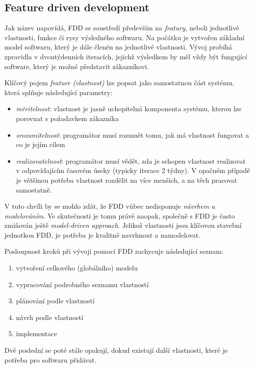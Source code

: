 \subsection{Feature driven development} \label{methods:fdd}

Jak název napovídá, FDD se soustředí především na \emph{featury}, neboli jednotlivé vlastnosti, funkce či rysy výsledného softwaru. Na počátku je vytvořen základní model softwaru, který je dále členěn na jednotlivé vlastnosti. Vývoj probíhá zpravidla v dvoutýdenních iteracích, jejichž výsledkem by měl vždy být fungující software, který je možné představit zákazníkovi.

Klíčový pojem \emph{feature (vlastnost)}  lze popsat jako samostatnou část systému, která splňuje následující parametry:
\begin{itemize}
	\item \emph{měritelnost}: vlastnost je jasně uchopitelná komponenta systému, kterou lze porovnat s požadavkem zákazníka
	\item \emph{srozumitelnost}: programátor musí rozumět tomu, jak má vlastnost fungovat a co je jejím cílem
	\item \emph{realizovatelnost}: programátor musí vědět, zda je schopen vlastnost realizovat v odpovídajícím časovém úseky (typicky iterace 2 týdny). V opačném případě je většinou potřeba vlastnost rozdělit na více menších, a na těch pracovat samostatně.
\end{itemize}

V tuto chvíli by se mohlo zdát, že FDD vůbec nedisponuje \emph{návrhem a modelováním}. Ve skutečnosti je tomu právě naopak, společně s FDD je často zmiňován ještě \emph{model-driven approach}. Jelikož vlastnosti jsou klíčovou stavební jednotkou FDD, je potřeba je kvalitně navrhnout a namodelovat.

Posloupnost kroků při vývoji pomocí FDD zachycuje následující seznam:
\begin{enumerate}
	\item vytvoření celkového (globálního) modelu
	\item vypracování podrobného seznamu vlastností
	\item plánování podle vlastností
	\item návrh podle vlastností
	\item implementace
\end{enumerate}
Dvě poslední se poté stále opakují, dokud existují další vlastnosti, které je potřeba pro softwaru přidávat.

